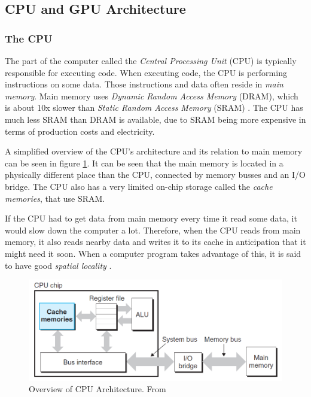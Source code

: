\newpage
\subsection{CPU and GPU Architecture}

\subsubsection{The CPU}

The part of the computer called the \textit{Central Processing Unit} (CPU) is typically responsible for executing code. When executing code, the CPU is performing instructions on some data. Those instructions and data often reside in \textit{main memory}. Main memory uses \textit{Dynamic Random Access Memory} (DRAM), which is about 10x slower than \textit{Static Random Access Memory} (SRAM) \cite[p. 561-562]{computersystems}. The CPU has much less SRAM than DRAM is available, due to SRAM being more expensive in terms of production costs and electricity.

A simplified overview of the CPU's architecture and its relation to main memory can be seen in figure \ref{fig:cpu_architecture}. It can be seen that the main memory is located in a physically different place than the CPU, connected by memory busses and an I/O bridge. The CPU also has a very limited on-chip storage called the \textit{cache memories}, that use SRAM.

If the CPU had to get data from main memory every time it read some data, it would slow down the computer a lot. Therefore, when the CPU reads from main memory, it also reads nearby data and writes it to its cache in anticipation that it might need it soon. When a computer program takes advantage of this, it is said to have good \textit{spatial locality} \cite[p. 640]{computersystems}.

\begin{figure}[h]
\includegraphics[width=\textwidth]{Documents/Report/Figures/CPU Architecture.png}
\caption{Overview of CPU Architecture. From \cite{computersystems}}
\label{fig:cpu_architecture}
\end{figure}

